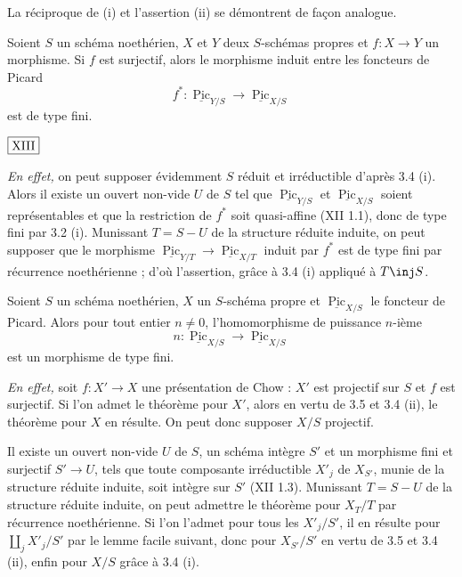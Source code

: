 La réciproque de (i) et l'assertion (ii) se démontrent de façon analogue.

\begin{thm}\label{thm:3.5} Soient $S$ un schéma noethérien, $X$ et $Y$ deux $S$-schémas propres et $f : X \to Y$ un morphisme. Si $f$ est surjectif, alors le morphisme induit entre les foncteurs de Picard
\[
f^* : \underline{\operatorname{Pic}}_{Y/S} \to \underline{\operatorname{Pic}}_{X/S}
\]
est de type fini.
\end{thm}

\begin{flushright}
$\fbox{\text{XIII}}$
\end{flushright}

\noindent\textit{En effet,} on peut supposer évidemment $S$ réduit et irréductible d'après 3.4 (i). Alors il existe un ouvert non-vide $U$ de $S$ tel que $\underline{\operatorname{Pic}}_{Y/S}$ et $\underline{\operatorname{Pic}}_{X/S}$ soient représentables et que la restriction de $f^*$ soit quasi-affine (XII 1.1), donc de type fini par 3.2 (i). Munissant $T = S - U$ de la structure réduite induite, on peut supposer que le morphisme $\underline{\operatorname{Pic}}_{Y/T} \to \underline{\operatorname{Pic}}_{X/T}$ induit par $f^*$ est de type fini par récurrence noethérienne ; d'où l'assertion, grâce à 3.4 (i) appliqué à $T \inj S$.

\begin{thm}\label{thm:3.6} Soient $S$ un schéma noethérien, $X$ un $S$-schéma propre et $\underline{\operatorname{Pic}}_{X/S}$ le foncteur de Picard. Alors pour tout entier $n \neq 0$, l'homomorphisme de puissance $n$-ième
\[
n : \underline{\operatorname{Pic}}_{X/S} \to \underline{\operatorname{Pic}}_{X/S}
\]
est un morphisme de type fini.
\end{thm}

\noindent\textit{En effet,} soit $f : X' \to X$ une présentation de Chow : $X'$ est projectif sur $S$ et $f$ est surjectif. Si l'on admet le théorème pour $X'$, alors en vertu de 3.5 et 3.4 (ii), le théorème pour $X$ en résulte. On peut donc supposer $X/S$ projectif.

Il existe un ouvert non-vide $U$ de $S$, un schéma intègre $S'$ et un morphisme fini et surjectif $S' \to U$, tels que toute composante irréductible $X'_j$ de $X_{S'}$, munie de la structure réduite induite, soit intègre sur $S'$ (XII 1.3). Munissant $T = S - U$ de la structure réduite induite, on peut admettre le théorème pour $X_T/T$ par récurrence noethérienne. Si l'on l'admet pour tous les $X'_j/S'$, il en résulte pour $\coprod_j X'_j/S'$ par le lemme facile suivant, donc pour $X_{S'}/S'$ en vertu de 3.5 et 3.4 (ii), enfin pour $X/S$ grâce à 3.4 (i).

